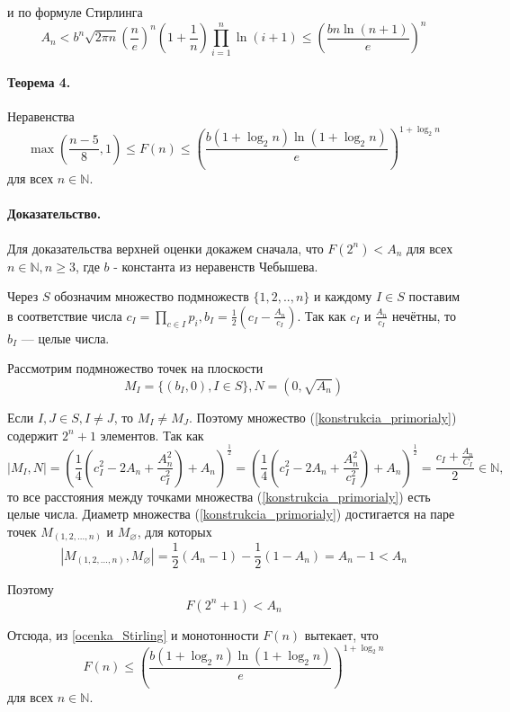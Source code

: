 \documentclass[a4paper,14pt]{article} %
\begin{document}
и по формуле Стирлинга
\begin{equation}\label{ocenka_Stirling}
A_n <
b^n \sqrt{2\pi n} \left(\frac{n}{e}\right)^n \left(1+\frac{1}{n}\right) \prod_{i=1}^{n} \ln(i+1)
\leq \left(\frac{bn\ln (n+1)}{e}\right)^n
\end{equation}


\paragraph{Теорема 4.}
Неравенства
$$
	\max\left( \frac{n-5}{8}, 1 \right) \leq F(n) \leq \left( \frac{b (1+\log_2 n )\ln (1 + \log_2 n)}{e}\right)^{1+\log_2 n}
$$
для всех $n\in\mathbb{N}$.

\paragraph{Доказательство.}
Для доказательства верхней оценки докажем сначала, что
$F(2^n)<A_n$ для всех $n\in\mathbb{N}, n \geq 3$, где $b$ - константа из неравенств Чебышева.

Через $S$ обозначим множество подмножеств $\{1,2,..,n\}$ и каждому $I\in S$ поставим в соответствие числа $c_I=\prod\limits_{c\in I}p_i, b_I=\frac{1}{2}\left(c_I-\frac{A_n}{c_I}\right)$.
Так как $c_I$ и $\frac{A_n}{c_I}$ нечётны, то $b_I$ --- целые числа.

Рассмотрим подмножество точек на плоскости
\begin{equation}\label{konstrukcia_primorialy}
M_I=\{(b_I,0), I\in S\}, N=(0, \sqrt{A_n})
\end{equation}

Если $I,J \in S, I \neq J$, то $M_I \neq M_J$.
Поэтому множество (\ref{konstrukcia_primorialy}) содержит $2^n+1$ элементов.
Так как
\begin{equation*}
	|M_I,N|=\left(\frac{1}{4}\left( c_I^2 - 2 A_n + \frac{A_n^2}{c_I^2} \right)+A_n\right)^\frac{1}{2}=
	\left(\frac{1}{4}\left( c_I^2 - 2 A_n + \frac{A_n^2}{c_I^2} \right)+A_n\right)^\frac{1}{2}=
	\frac{c_I+\frac{A_n}{C_I}}{2} \in \mathbb{N},
\end{equation*}
то все расстояния между точками множества (\ref{konstrukcia_primorialy}) есть целые числа.
Диаметр множества (\ref{konstrukcia_primorialy}) достигается на паре точек $M_{(1,2,...,n)}$ и $M_{\varnothing}$, для которых
$$
|M_{(1,2,...,n)},M_{\varnothing}|=\frac{1}{2}(A_n-1)-\frac{1}{2}(1-A_n) = A_n-1 < A_n
$$

Поэтому 
$$
F(2^n+1) < A_n
$$

Отсюда, из \ref{ocenka_Stirling} и монотонности $F(n)$ вытекает, что
\begin{equation}\label{ocenka_primoryaly}
	F(n) \leq \left( \frac{b (1+\log_2 n )\ln (1 + \log_2 n)}{e}\right)^{1+\log_2 n}
\end{equation}
для всех $n\in \mathbb{N}$.
\end{document}
